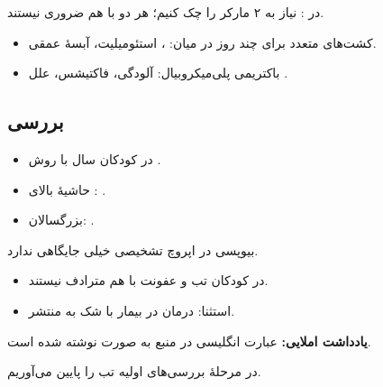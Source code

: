 \documentclass[12pt,a4paper]{article}
\begin{document}
در : نیاز به ۲ مارکر را چک کنیم؛ هر دو با هم ضروری نیستند.

\begin{itemize}
\item کشت‌های متعدد برای چند روز در میان: ، استئومیلیت، آبسهٔ عمقی.
\item باکتریمی پلی‌میکروبیال: آلودگی، فاکتیشس، علل .
\end{itemize}

\subsection*{بررسی }
\begin{itemize}
\item در کودکان  سال با روش .
\item حاشیهٔ بالای :  \FUOmath{\gamma} .
\item بزرگسالان: .
\end{itemize}

بیوپسی در اپروچ تشخیصی  خیلی جایگاهی ندارد.

\begin{itemize}
\item در کودکان تب و عفونت با هم مترادف نیستند.
\item استثنا: درمان  در بیمار  با شک به  منتشر.
\end{itemize}
\textbf{یادداشت املایی:} عبارت انگلیسی در منبع به صورت  نوشته شده است.

در مرحلهٔ بررسی‌های اولیه تب را پایین می‌آوریم.

\clearpage
\end{document}
